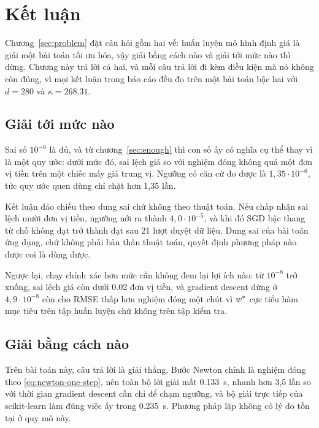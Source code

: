 \chapter{Kết luận}
\label{sec:conclusion}

Chương~\ref{sec:problem} đặt câu hỏi gồm hai vế: huấn luyện mô hình định giá là
giải một bài toán tối ưu hóa, vậy giải bằng cách nào và giải tới mức nào thì
dừng. Chương này trả lời cả hai, và mỗi câu trả lời đi kèm điều kiện mà nó không
còn đúng, vì mọi kết luận trong báo cáo đều đo trên một bài toán bậc hai với
$d = 280$ và $\kappa = \num{268.31}$.

\section{Giải tới mức nào}
\label{sec:conclusion-how-far}

Sai số $10^{-6}$ là đủ, và từ chương~\ref{sec:enough} thì con số ấy có nghĩa cụ
thể thay vì là một quy ước: dưới mức đó, sai lệch giá so với nghiệm đóng không
quá một đơn vị tiền trên một chiếc máy giá trung vị. Ngưỡng có căn cứ đo được là
$1{,}35 \cdot 10^{-6}$, tức quy ước quen dùng chỉ chặt hơn 1,35 lần.

Kết luận đảo chiều theo dung sai chứ không theo thuật toán. Nếu chấp nhận sai
lệch mười đơn vị tiền, ngưỡng nới ra thành $4{,}0 \cdot 10^{-5}$, và khi đó SGD
bậc thang từ chỗ không đạt trở thành đạt sau 21 lượt duyệt dữ liệu. Dung sai của
bài toán ứng dụng, chứ không phải bản thân thuật toán, quyết định phương pháp nào
được coi là dùng được.

Ngược lại, chạy chính xác hơn mức cần không đem lại lợi ích nào: từ
$10^{-8}$ trở xuống, sai lệch giá còn dưới \num{0.02} đơn vị tiền, và gradient
descent dừng ở $4{,}9 \cdot 10^{-8}$ còn cho RMSE thấp hơn nghiệm đóng một chút
vì $w^{*}$ cực tiểu hàm mục tiêu trên tập huấn luyện chứ không trên tập kiểm
tra.

\section{Giải bằng cách nào}
\label{sec:conclusion-how}

Trên bài toán này, câu trả lời là giải thẳng. Bước Newton chính là nghiệm đóng
theo \eqref{eq:newton-one-step}, nên toàn bộ lời giải mất \SI{0.133}{\second},
nhanh hơn 3,5 lần so với thời gian gradient descent cần chỉ để chạm ngưỡng, và
bộ giải trực tiếp của scikit-learn làm đúng việc ấy trong \SI{0.235}{\second}.
Phương pháp lặp không có lý do tồn tại ở quy mô này.

